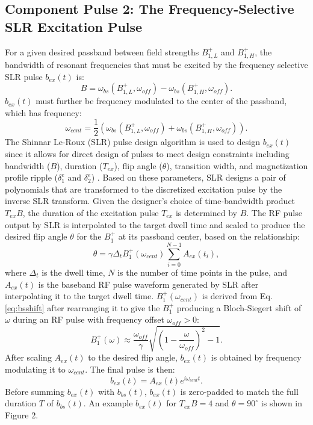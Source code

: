 \documentclass{article}
\newcommand{\bext}{b_{ex}(t)}
\newcommand{\bbst}{b_{bs}(t)}
\begin{document}
\subsection*{Component Pulse 2: The Frequency-Selective SLR Excitation Pulse}
For a given desired passband between field strengths $B_{1,L}^+$ and $B_{1,H}^+$, 
the bandwidth of resonant frequencies that must be excited by the frequency selective SLR pulse $b_{ex}(t)$ is:
\begin{equation}
B = \omega_{bs}(B_{1,L}^+, \omega_{off})-\omega_{bs}(B_{1,H}^+, \omega_{off}).
\label{eq:bandwidth}
\end{equation}
$\bext$ must further be frequency modulated to the center of the passband,
which has frequency:
\begin{equation}
\omega_{cent} = \frac{1}{2} \left(\omega_{bs}(B_{1,L}^+, \omega_{off}) + \omega_{bs}(B_{1,H}^+, \omega_{off})\right).
\label{eq:centerfreq}
\end{equation}
The Shinnar Le-Roux (SLR) pulse design algorithm is used to design $\bext$ since
it allows for direct design of pulses to meet design constraints including bandwidth ($B$), 
duration ($T_{ex}$), flip angle ($\theta$), transition width, 
and magnetization profile ripple ($\delta_1^e$ and $\delta_2^e$) \cite{Pauly1991ParameterAlgorithm}. 
Based on these parameters, 
SLR designs a pair of polynomials that are 
transformed to the discretized excitation pulse by the inverse SLR transform. 
Given the designer's choice of time-bandwidth product $T_{ex}B$, 
the duration of the excitation pulse $T_{ex}$ is determined by $B$.
The RF pulse output by SLR is interpolated to the target dwell time
and scaled to produce the desired flip angle $\theta$ for the $B_1^+$ 
at its passband center, based on the relationship:
\begin{equation}
    \theta = \gamma \Delta_t B_1^+(\omega_{cent}) \sum_{i=0}^{N-1} A_{ex}(t_i),
    \label{eq:fa_scaling}
\end{equation}
where $\Delta_t$ is the dwell time, 
$N$ is the number of time points in the pulse,
and $A_{ex}(t)$ is the baseband RF pulse waveform generated by SLR after interpolating
it to the target dwell time.
$B_1^+(\omega_{cent})$ is derived from Eq. \ref{eq:bsshift} after rearranging it 
to give the $B_1^+$ producing a Bloch-Siegert shift of $\omega$ during an RF pulse with frequency offset $\omega_{off}>0$: 
\begin{equation}
    B_1^+(\omega) \approx \frac{\omega_{off}}{\gamma}\sqrt{\left(1-\frac{\omega}{\omega_{off}}\right)^2-1}.
\label{eq:b1bsshift}
\end{equation}
After scaling $A_{ex}(t)$ to the desired flip angle, 
$b_{ex}(t)$ is obtained by frequency modulating it to $\omega_{cent}$.
The final pulse is then:
\begin{equation}
    b_{ex}(t) = A_{ex}(t) e^{i \omega_{cent} t}.
\end{equation}
Before summing $b_{ex}(t)$ with $b_{bs}(t)$, $b_{ex}(t)$ is zero-padded to match the full duration $T$ of $\bbst$.
An example $\bext$ for $T_{ex}B=4$ and $\theta=90^\circ$ is shown in Figure 2. 
\end{document}
